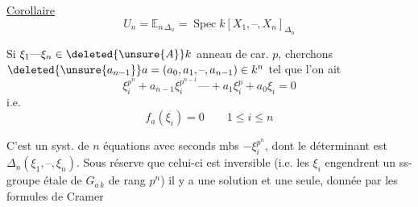 \uline{Corollaire} \[ U_n=\mathbb E_{n\,\Delta_n}=\operatorname{Spec}k[X_1,\text{--},X_n]_{\Delta_n} \]

Si $\xi_1\text{---}\xi_n\in\deleted{\unsure{A}}k$ anneau de car. $p$, cherchons $\deleted{\unsure{a_{n-1}}}a=(a_0,a_1,\text{--},a_{n-1})\in k^n$ tel que l'on ait
\[ \xi_i^{p^n}+a_{n-1}\xi_i^{p^{n-1}}\text{---}+a_1\xi_i^p+a_0\xi_i=0 \tag*{(*)} \]
i.e.
\[ f_a(\xi_i)=0 \qquad 1\leq i\leq n \]

C'est un syst. de $n$ équations   avec seconds mbs $-\xi_i^{p^n}$, dont le déterminant est $\Delta_n(\xi_1,\text{--},\xi_n)$. Sous réserve que celui-ci est inversible (i.e. les $\xi_i$ engendrent un ss-groupe  étale de $G_{a\,k}$ de rang $p^n$) il y a une solution et une seule, donnée par les formules de Cramer

